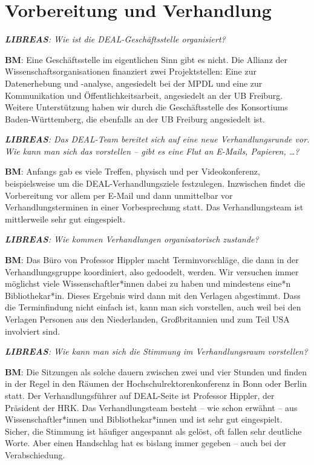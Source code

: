 \documentclass[a4paper,
fontsize=11pt,
oneside,
numbers=noperiodatend,
parskip=half-,
bibliography=totoc,
final
]{scrartcl}
\begin{document}
\hypertarget{vorbereitung-und-verhandlung}{%
\section*{Vorbereitung und
Verhandlung}\label{vorbereitung-und-verhandlung}}

\emph{\textbf{LIBREAS}: Wie ist die DEAL-Geschäftsstelle organisiert?}

\textbf{BM}: Eine Geschäftsstelle im eigentlichen Sinn gibt es nicht.
Die Allianz der Wissenschaftsorganisationen finanziert zwei
Projektstellen: Eine zur Datenerhebung und -analyse, angesiedelt bei der
MPDL und eine zur Kommunikation und Öffentlichkeitsarbeit, angesiedelt
an der UB Freiburg. Weitere Unterstützung haben wir durch die
Geschäftsstelle des Konsortiums Baden-Württemberg, die ebenfalls an der
UB Freiburg angesiedelt ist.

\emph{\textbf{LIBREAS}: Das DEAL-Team bereitet sich auf eine neue
Verhandlungsrunde vor. Wie kann man sich das vorstellen -- gibt es eine
Flut an E-Mails, Papieren, \ldots{}?}

\textbf{BM}: Anfangs gab es viele Treffen, physisch und per
Videokonferenz, beispielsweise um die DEAL-Verhandlungsziele
festzulegen. Inzwischen findet die Vorbereitung vor allem per E-Mail und
dann unmittelbar vor Verhandlungsterminen in einer Vorbesprechung statt.
Das Verhandlungsteam ist mittlerweile sehr gut eingespielt.

\emph{\textbf{LIBREAS}: Wie kommen Verhandlungen organisatorisch
zustande?}

\textbf{BM}: Das Büro von Professor Hippler macht Terminvorschläge, die
dann in der Verhandlungsgruppe koordiniert, also gedoodelt, werden. Wir
versuchen immer möglichst viele Wissenschaftler*innen dabei zu haben und
mindestens eine*n Bibliothekar*in. Dieses Ergebnis wird dann mit den
Verlagen abgestimmt. Dass die Terminfindung nicht einfach ist, kann man
sich vorstellen, auch weil bei den Verlagen Personen aus den
Niederlanden, Großbritannien und zum Teil USA involviert sind.

\emph{\textbf{LIBREAS}: Wie kann man sich die Stimmung im
Verhandlungsraum vorstellen?}

\textbf{BM}: Die Sitzungen als solche dauern zwischen zwei und vier
Stunden und finden in der Regel in den Räumen der
Hochschulrektorenkonferenz in Bonn oder Berlin statt. Der
Verhandlungsführer auf DEAL-Seite ist Professor Hippler, der Präsident
der HRK. Das Verhandlungsteam besteht -- wie schon erwähnt -- aus
Wissenschaftler*innen und Bibliothekar*innen und ist sehr gut
eingespielt. Sicher, die Stimmung ist häufiger angespannt als gelöst,
oft fallen sehr deutliche Worte. Aber einen Handschlag hat es bislang
immer gegeben -- auch bei der Verabschiedung.
\end{document}
